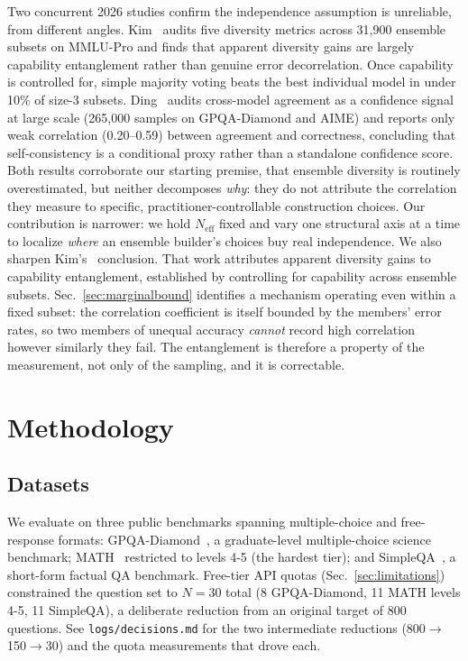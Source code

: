 \documentclass[conference]{IEEEtran}
\begin{document}
Two concurrent 2026 studies confirm the independence assumption is
unreliable, from different angles.
Kim~\cite{kim2026diversitymetrics} audits five diversity metrics across
31{,}900 ensemble subsets on MMLU-Pro and finds that apparent diversity
gains are largely capability entanglement rather than genuine error
decorrelation. Once capability is controlled for, simple majority voting
beats the best individual model in under 10\% of size-3 subsets.
Ding~\cite{ding2026agreement} audits cross-model agreement as a confidence
signal at large scale (265{,}000 samples on GPQA-Diamond and AIME) and
reports only weak correlation (0.20--0.59) between agreement and
correctness, concluding that self-consistency is a conditional proxy rather
than a standalone confidence score. Both results corroborate our starting
premise, that ensemble diversity is routinely overestimated, but neither
decomposes \emph{why}: they do not attribute the correlation they measure
to specific, practitioner-controllable construction choices.
Our contribution is narrower: we hold $N_\text{eff}$ fixed and vary one
structural axis at a time to localize \emph{where} an ensemble builder's
choices buy real independence. We also sharpen
Kim's~\cite{kim2026diversitymetrics} conclusion. That work attributes
apparent diversity gains to capability entanglement, established by
controlling for capability across ensemble subsets.
Sec.~\ref{sec:marginalbound} identifies a mechanism operating even within a
fixed subset: the correlation coefficient is itself bounded by the members'
error rates, so two members of unequal accuracy \emph{cannot} record high
correlation however similarly they fail. The entanglement is therefore a
property of the measurement, not only of the sampling, and it is
correctable.

\section{Methodology}

\subsection{Datasets}
We evaluate on three public benchmarks spanning multiple-choice and
free-response formats: GPQA-Diamond~\cite{rein2023gpqa}, a graduate-level
multiple-choice science benchmark; MATH~\cite{hendrycks2021math} restricted
to levels 4-5 (the hardest tier); and SimpleQA~\cite{wei2024simpleqa}, a
short-form factual QA benchmark. Free-tier API quotas (Sec.~\ref{sec:limitations})
constrained the question set to $N=30$ total (8 GPQA-Diamond, 11 MATH
levels 4-5, 11 SimpleQA), a deliberate reduction from an original target
of 800 questions. See \texttt{logs/decisions.md} for the two intermediate
reductions (800$\to$150$\to$30) and the quota measurements that drove each.
\end{document}
